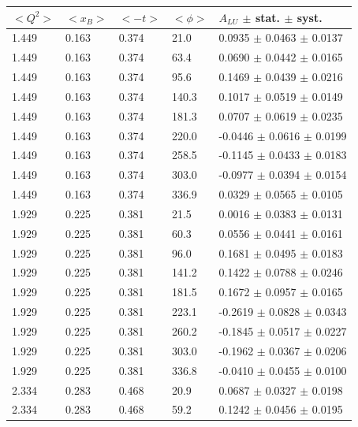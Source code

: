 \documentclass{article}
\begin{document}
\begin{table}[!h]
   \begin{center}
      \begin{tabular}{||l|l|l|l|l||}
         \hline
 $<Q^{2}>$ & $<x_{B}>$ & $<-t>$ & $<\phi>$ & $A_{LU}$ $\pm$ stat. $\pm$ syst.\\
         \hline
 1.449 & 0.163 & 0.374 &  21.0  &  0.0935 $\pm$ 0.0463  $\pm$  0.0137 \\ 
  1.449 & 0.163 & 0.374 &  63.4  &  0.0690 $\pm$ 0.0442  $\pm$  0.0165 \\ 
  1.449 & 0.163 & 0.374 &  95.6  &  0.1469 $\pm$ 0.0439  $\pm$  0.0216 \\ 
  1.449 & 0.163 & 0.374 & 140.3  &  0.1017 $\pm$ 0.0519  $\pm$  0.0149 \\ 
  1.449 & 0.163 & 0.374 & 181.3  &  0.0707 $\pm$ 0.0619  $\pm$  0.0235 \\ 
  1.449 & 0.163 & 0.374 & 220.0  & -0.0446 $\pm$ 0.0616  $\pm$  0.0199 \\ 
  1.449 & 0.163 & 0.374 & 258.5  & -0.1145 $\pm$ 0.0433  $\pm$  0.0183 \\ 
  1.449 & 0.163 & 0.374 & 303.0  & -0.0977 $\pm$ 0.0394  $\pm$  0.0154 \\ 
  1.449 & 0.163 & 0.374 & 336.9  &  0.0329 $\pm$ 0.0565  $\pm$  0.0105 \\ 
  \hline
  1.929 & 0.225 & 0.381 &  21.5  &  0.0016 $\pm$ 0.0383  $\pm$  0.0131 \\
  1.929 & 0.225 & 0.381 &  60.3  &  0.0556 $\pm$ 0.0441  $\pm$  0.0161 \\
  1.929 & 0.225 & 0.381 &  96.0  &  0.1681 $\pm$ 0.0495  $\pm$  0.0183 \\
  1.929 & 0.225 & 0.381 & 141.2  &  0.1422 $\pm$ 0.0788  $\pm$  0.0246 \\
  1.929 & 0.225 & 0.381 & 181.5  &  0.1672 $\pm$ 0.0957  $\pm$  0.0165 \\
  1.929 & 0.225 & 0.381 & 223.1  & -0.2619 $\pm$ 0.0828  $\pm$  0.0343 \\
  1.929 & 0.225 & 0.381 & 260.2  & -0.1845 $\pm$ 0.0517  $\pm$  0.0227 \\
  1.929 & 0.225 & 0.381 & 303.0  & -0.1962 $\pm$ 0.0367  $\pm$  0.0206 \\
  1.929 & 0.225 & 0.381 & 336.8  & -0.0410 $\pm$ 0.0455  $\pm$  0.0100 \\
  \hline
  2.334 & 0.283 & 0.468 &  20.9  &  0.0687 $\pm$ 0.0327  $\pm$  0.0198 \\
  2.334 & 0.283 & 0.468 &  59.2  &  0.1242 $\pm$ 0.0456  $\pm$  0.0195 \\

\end{tabular}
\end{center}
\end{table}
\end{document}
